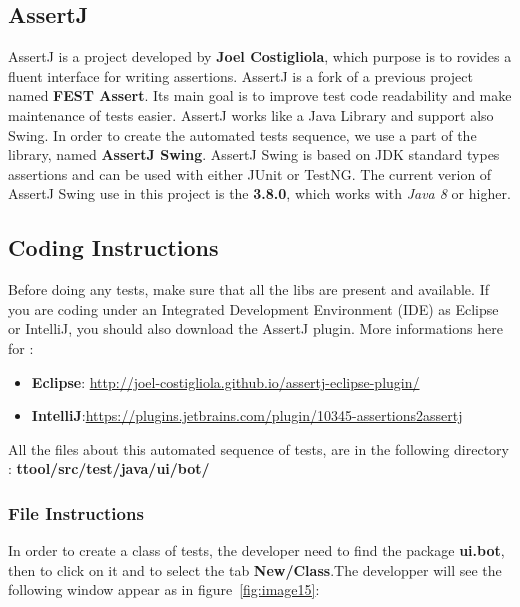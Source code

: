 \documentclass[12pt]{article}
\begin{document}
\subsection{AssertJ}
AssertJ is a project developed by \textbf{Joel Costigliola}, which purpose is to rovides a fluent interface for writing assertions. 
AssertJ is a fork of a previous project named \textbf{FEST Assert}. Its main goal is to improve test code readability and make maintenance of tests easier.
AssertJ works like a Java Library and support also Swing.\newline
In order to create the automated tests sequence, we use a part of the library, named \textbf{AssertJ Swing}.
AssertJ Swing is based on JDK standard types assertions and can be used with either JUnit or TestNG. \newline
The current verion of AssertJ Swing use in this project is the \textbf{3.8.0}, which works with \textit{Java 8} or higher.

\newpage

\subsection{Coding Instructions}
Before doing any tests, make sure that all the libs are present and available. \newline
If you are coding under an Integrated Development Environment (IDE) as Eclipse or IntelliJ, you should also download the AssertJ plugin. More informations here for :

\begin{itemize}
   \item \textbf{Eclipse}: \url{http://joel-costigliola.github.io/assertj-eclipse-plugin/}
   \item \textbf{IntelliJ}:\url{https://plugins.jetbrains.com/plugin/10345-assertions2assertj}
\end{itemize}

All the files about this automated sequence of tests, are in the following directory : \textbf{ttool/src/test/java/ui/bot/}

\subsubsection{File Instructions}
In order to create a class of tests, the developer need to find the package \textbf{ui.bot}, then to click on it and to select the tab \textbf{New/Class}.The developper will see the following window appear as in figure~\ref{fig:image15}:
\end{document}
